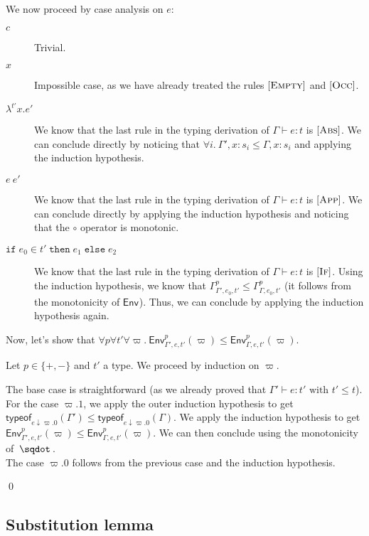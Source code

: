 \documentclass[a4paper]{article}%
\newcommand{\worra}[2]{#1\mathop{\,\sqdot\,} #2}
\newcommand{\ite}[4]{\ensuremath{\texttt{if}\;#1\in#2\;\texttt{then}\;#3\;\texttt{else}\;#4}}
\newcommand{\tyof}[2]{\textsf{typeof}_{#2}(#1)}
\newcommand{\Gp}[2]{\textsf{Env}^{#1}_{#2}}
\theoremstyle{definition}
\newcommand {\Rule}[1] {[\textsc{#1}]}
\begin{document}
    We now proceed by case analysis on $e$:
    \begin{description}
      \item[$c$] Trivial.
      \item[$x$] Impossible case, as we have already treated the rules $\Rule{Empty}$ and $\Rule{Occ}$.
      \item[$\lambda^{t'}x.e'$] We know that the last rule in the typing derivation of $\Gamma \vdash e:t$ is $\Rule {Abs}$.
      We can conclude directly by noticing that $\forall i.\ \Gamma',x:s_i \leq \Gamma,x:s_i$ and applying the induction hypothesis.
      \item[$e\ e'$] We know that the last rule in the typing derivation of $\Gamma \vdash e:t$ is $\Rule {App}$.
      We can conclude directly by applying the induction hypothesis and noticing that the $\circ$ operator is monotonic.
      \item[$\ite {e_0} {t'} {e_1} {e_2}$] We know that the last rule in the typing derivation of $\Gamma \vdash e:t$ is $\Rule {If}$.
      Using the induction hypothesis, we know that $\Gamma^p_{\Gamma',e_0,t'} \leq \Gamma^p_{\Gamma,e_0,t'}$ (it follows from the monotonicity of $\Gp {} {}$).
      Thus, we can conclude by applying the induction hypothesis again.\\
    \end{description}

    Now, let's show that $\forall p \forall t' \forall \varpi.\ \Gp p {\Gamma',e,t'} (\varpi) \leq \Gp p {\Gamma,e,t'} (\varpi)$.

    Let $p\in \{+,-\}$ and $t'$ a type.
    We proceed by induction on $\varpi$.
    
    The base case is straightforward (as we already proved that $\Gamma' \vdash e:t' \text{ with } t' \leq t$).\\
    For the case $\varpi.1$, we apply the outer induction hypothesis to get $\tyof {\Gamma'} {e\downarrow\varpi.0} \leq \tyof {\Gamma} {e\downarrow\varpi.0}$.
    We apply the induction hypothesis to get $\Gp p {\Gamma',e,t'} (\varpi) \leq \Gp p {\Gamma,e,t'} (\varpi)$. We can then conclude using the monotonicity of $\worra {} {}$.\\
    The case $\varpi.0$ follows from the previous case and the induction hypothesis.

    \qed

    \subsection{Substitution lemma}
\end{document}
